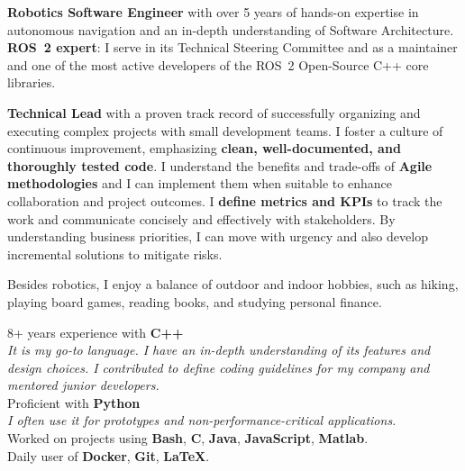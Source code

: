 \documentclass[letterpaper]{soragna-onepage-twocols} %
\begin{document}
\begin{minipage}[t]{0.3\textwidth} %



\textbf{Robotics Software Engineer} with over 5 years of hands-on expertise in autonomous navigation and an in-depth understanding of Software Architecture.
\textbf{ROS~2 expert}: I serve in its Technical Steering Committee and as a maintainer and one of the most active developers of the ROS~2 Open-Source C++ core libraries.  

\textbf{Technical Lead} with a proven track record of successfully organizing and executing complex projects with small development teams.
I foster a culture of continuous improvement, emphasizing \textbf{clean, well-documented, and thoroughly tested code}.
I understand the benefits and trade-offs of \textbf{Agile methodologies} and I can implement them when suitable to enhance collaboration and project outcomes.
I \textbf{define metrics and KPIs} to track the work and communicate concisely and effectively with stakeholders. 
By understanding business priorities, I can move with urgency and also develop incremental solutions to mitigate risks.

Besides robotics, I enjoy a balance of outdoor and indoor hobbies, such as hiking, playing board games, reading books, and studying personal finance.

\sectionspace %



8+ years experience with \textbf{C++}\\
{\emph{It is my go-to language.
I have an in-depth understanding of its features and design choices.
I contributed to define coding guidelines for my company and mentored junior developers.}}\\
Proficient with \textbf{Python}\\
{\emph{I often use it for prototypes and non-performance-critical applications.}}\\
Worked on projects using \textbf{Bash}, \textbf{C}, \textbf{Java}, \textbf{JavaScript},  \textbf{Matlab}.\\
Daily user of \textbf{Docker}, \textbf{Git}, \textbf{LaTeX}.\\


\end{minipage}
\end{document}

